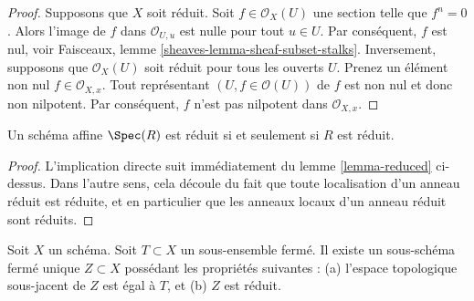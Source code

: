 \begin{proof}
Supposons que $X$ soit réduit.
Soit $f \in \mathcal{O}_X(U)$ une section telle que $f^n = 0$. Alors
l'image de $f$ dans $\mathcal{O}_{U, u}$ est nulle pour tout $u
\in U$. Par conséquent, $f$ est nul, voir
Faisceaux, lemme \ref{sheaves-lemma-sheaf-subset-stalks}.
Inversement, supposons que $\mathcal{O}_X(U)$ soit réduit
pour tous les ouverts $U$. Prenez un élément non nul $f \in \mathcal{O}_{X, x}$.
Tout représentant $(U, f \in \mathcal{O}(U))$ de $f$ est non nul et donc non
nilpotent. Par conséquent, $f$ n'est pas nilpotent dans $\mathcal{O}_{X, x}$.
\end{proof}

\begin{lemma}
\label{lemma-affine-reduced}
Un schéma affine $\Spec(R)$ est réduit si
et seulement si $R$ est réduit.
\end{lemma}

\begin{proof}
L'implication directe suit immédiatement du lemme
\ref{lemma-reduced} ci-dessus. Dans
l'autre sens, cela découle du fait que toute localisation d'un
anneau réduit est réduite, et en particulier que les anneaux locaux
d'un anneau réduit sont réduits.
\end{proof}

\begin{lemma}
\label{lemma-reduced-closed-subscheme}
Soit $X$ un schéma. Soit $T \subset X$ un sous-ensemble fermé.
Il existe un sous-schéma fermé unique $Z \subset X$ possédant
les propriétés suivantes : (a) l'espace topologique
sous-jacent de $Z$ est égal à $T$, et (b) $Z$ est réduit.
\end{lemma}

